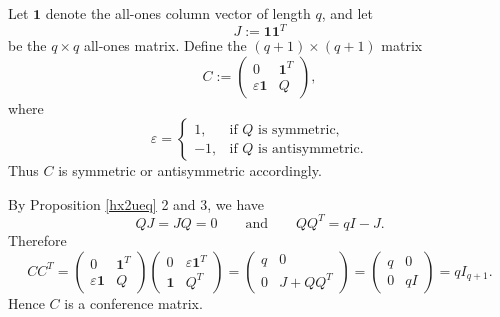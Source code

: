 \documentclass[11pt, a4paper]{ctexrep}
\begin{document}
\begin{definition}
    Let \(\mathbf{1}\) denote the all-ones column vector of length \(q\), and let
    \[
        J:=\mathbf{1}\mathbf{1}^T
    \]
    be the \(q\times q\) all-ones matrix. Define the \((q+1)\times(q+1)\) matrix
    \[
        C:=
        \begin{pmatrix}
            0                      & \mathbf{1}^T \\
            \varepsilon \mathbf{1} & Q
        \end{pmatrix},
    \]
    where
    \[
        \varepsilon=
        \begin{cases}
            1,  & \text{if } Q \text{ is symmetric},     \\
            -1, & \text{if } Q \text{ is antisymmetric}.
        \end{cases}
    \]
    Thus \(C\) is symmetric or antisymmetric accordingly.

    By Proposition \ref{hx2ueq} 2 and 3, we have
    \[
        QJ=JQ=0
        \qquad\text{and}\qquad
        QQ^T=qI-J.
    \]
    Therefore
    \[
        CC^T=
        \begin{pmatrix}
            0                      & \mathbf{1}^T \\
            \varepsilon \mathbf{1} & Q
        \end{pmatrix}
        \begin{pmatrix}
            0          & \varepsilon \mathbf{1}^T \\
            \mathbf{1} & Q^T
        \end{pmatrix}
        =
        \begin{pmatrix}
            q & 0      \\
            0 & J+QQ^T
        \end{pmatrix}
        =
        \begin{pmatrix}
            q & 0  \\
            0 & qI
        \end{pmatrix}
        =
        qI_{q+1}.
    \]
    Hence \(C\) is a conference matrix.
\end{definition}
\end{document}
